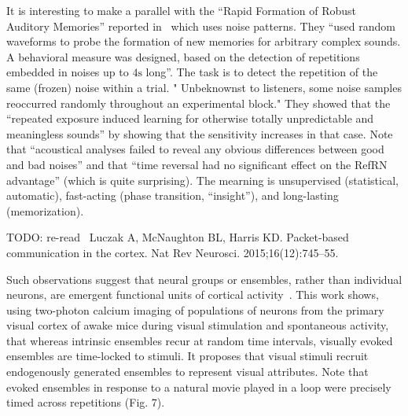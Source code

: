 \documentclass[brainsci, %
               review,submit,pdftex,moreauthors
               ]{Definitions/mdpi}
\begin{document}
It is interesting to make a parallel with the ``Rapid Formation of Robust Auditory Memories'' reported in~\citep{agus_rapid_2010} which uses noise patterns. They ``used random waveforms to probe the formation of new memories for arbitrary complex sounds. A behavioral measure was designed, based on the detection of repetitions embedded in noises up to $4 \si{\second}$ long''. The task is to detect the repetition of the same (frozen) noise within a trial. " Unbeknownst to listeners, some noise samples reoccurred randomly throughout an experimental block." They showed that the ``repeated exposure induced learning for otherwise totally unpredictable and meaningless sounds'' by showing that the sensitivity increases in that case. Note that ``acoustical analyses failed to reveal any obvious differences between good and bad noises'' and that ``time reversal had no significant effect on the RefRN advantage'' (which is quite surprising). The mearning is unsupervised (statistical, automatic), fast-acting (phase transition, ``insight''), and long-lasting (memorization).


TODO: re-read~\citep{luczak_packet-based_2015} Luczak A, McNaughton BL, Harris KD. Packet-based communication in the cortex. Nat Rev Neurosci. 2015;16(12):745--55.

Such observations suggest that neural groups or ensembles, rather than individual neurons, are emergent functional units of cortical activity~\citep{miller_visual_2014}. This work shows, using two-photon calcium imaging of populations of neurons from the primary visual cortex of awake mice during visual stimulation and spontaneous activity, that whereas intrinsic ensembles recur at random time intervals, visually evoked ensembles are time-locked to stimuli. It proposes that visual stimuli recruit endogenously generated ensembles to represent visual attributes. Note that evoked ensembles in response to a natural movie played in a loop were precisely timed across repetitions (Fig. 7).

\end{document}
